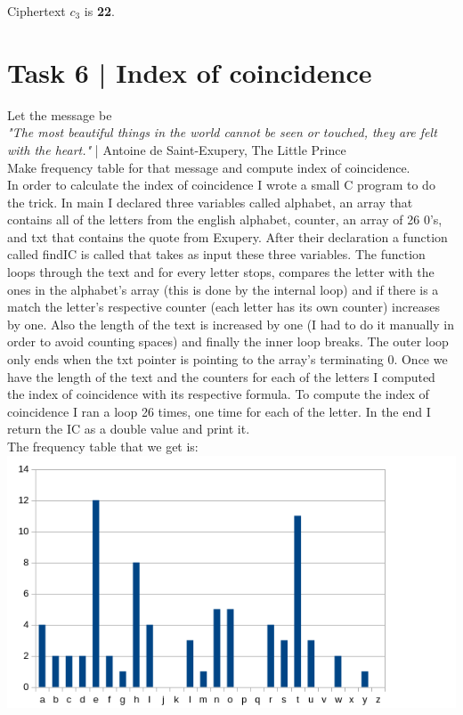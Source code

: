 \documentclass[12pt]{article}
\begin{document}
\noindent Ciphertext $c_3$ is \textbf{22}.


\section*{Task 6 | Index of coincidence}

Let the message be \\

\noindent \textit{"The most beautiful things in the world cannot be seen or touched, 
they are felt with the heart."} | Antoine de Saint-Exupery, The Little Prince \\

\noindent Make frequency table for that message and compute index of coincidence. \\

\noindent  In order to calculate the index of coincidence I wrote a small C program to do 
the trick. In main I declared three variables called alphabet, an array that contains all of 
the letters from the english alphabet, counter, an array of 26 0's, and txt that contains
the quote from Exupery. After their declaration a function called findIC is called that 
takes as input these three variables. The function loops through the text and for every letter stops,
compares the letter with the ones in the alphabet's array (this is done by the internal loop) and if there 
is a match the letter's respective counter (each letter has its own counter) increases by one. 
Also the length of the text is increased by one (I had to do it
manually in order to avoid counting spaces) and  finally the inner loop breaks. The outer loop only
ends when the txt pointer is pointing to the array's terminating 0. Once we have 
the length of the text and the counters for each of the letters I computed the index 
of coincidence with its respective formula. To compute the index of coincidence I ran a loop 
26 times, one time for each of the letter. In the end I return the IC as a double value and
print it. \\

\noindent The frequency table that we get is:  \\

\noindent \includegraphics[scale=0.5]{frequency_table} \\
\end{document}

